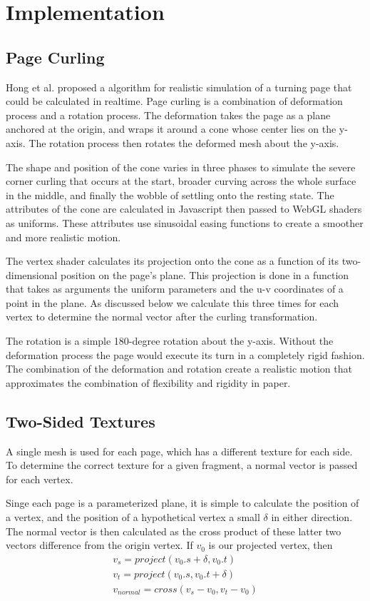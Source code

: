 \documentclass{acmsiggraph}                     %
\begin{document}
\section{Implementation}
\subsection{Page Curling}
Hong et al. proposed a algorithm for realistic simulation of a turning page that could be calculated in realtime. Page curling is a combination of deformation process and a rotation process. The deformation takes the page as a plane anchored at the origin, and wraps it around a cone whose center lies on the y-axis. The rotation process then rotates the deformed mesh about the y-axis.

The shape and position of the cone varies in three phases to simulate the severe corner curling that occurs at the start, broader curving across the whole surface in the middle, and finally the wobble of settling onto the resting state. The attributes of the cone are calculated in Javascript then passed to WebGL shaders as uniforms. These attributes use sinusoidal easing functions to create a smoother and more realistic motion.

The vertex shader calculates its projection onto the cone as a function of its two-dimensional position on the page's plane.  This projection is done in a function that takes as arguments the uniform parameters and the u-v coordinates of a point in the plane. As discussed below we calculate this three times for each vertex to determine the normal vector after the curling transformation.

The rotation is a simple 180-degree rotation about the y-axis. Without the deformation process the page would execute its turn in a completely rigid fashion. The combination of the deformation and rotation create a realistic motion that approximates the combination of flexibility and rigidity in paper.


\subsection{Two-Sided Textures}
A single mesh is used for each page, which has a different texture for each side. To determine the correct texture for a given fragment, a normal vector is passed for each vertex.

Singe each page is a parameterized plane, it is simple to calculate the position of a vertex, and the position of a hypothetical vertex a small $\delta$ in either direction. The normal vector is then calculated as the cross product of these latter two vectors difference from the origin vertex. If $v_0$ is our projected vertex, then
\begin{eqnarray}
v_s = project(v_0.s + \delta, v_0.t)\\
v_t = project(v_0.s, v_0.t + \delta)\\
v_{normal} = cross(v_s-v_0, v_t-v_0)
\end{eqnarray}
\end{document}
